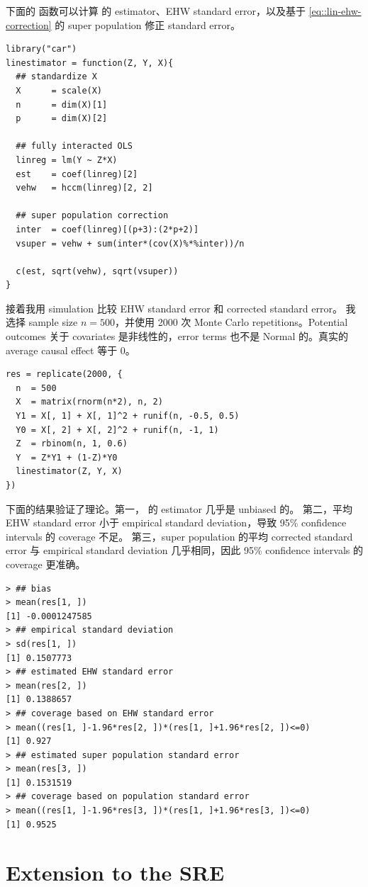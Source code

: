 下面的  函数可以计算 \citet{lin2013} 的 estimator、EHW standard error，以及基于 \eqref{eq::lin-ehw-correction} 的 super population 修正 standard error。 
\begin{lstlisting}
library("car")
linestimator = function(Z, Y, X){
  ## standardize X
  X      = scale(X)
  n      = dim(X)[1]
  p      = dim(X)[2]
  
  ## fully interacted OLS
  linreg = lm(Y ~ Z*X)
  est    = coef(linreg)[2]
  vehw   = hccm(linreg)[2, 2]
  
  ## super population correction
  inter  = coef(linreg)[(p+3):(2*p+2)]
  vsuper = vehw + sum(inter*(cov(X)%*%inter))/n
  
  c(est, sqrt(vehw), sqrt(vsuper))
}
\end{lstlisting}


接着我用 simulation 比较 EHW standard error 和 corrected standard error。
我选择 sample size $n=500$，并使用 2000 次 Monte Carlo repetitions。Potential outcomes 关于 covariates 是非线性的，error terms 也不是 Normal 的。真实的 average causal effect 等于 $0$。
\begin{lstlisting}
res = replicate(2000, {
  n  = 500
  X  = matrix(rnorm(n*2), n, 2)
  Y1 = X[, 1] + X[, 1]^2 + runif(n, -0.5, 0.5)
  Y0 = X[, 2] + X[, 2]^2 + runif(n, -1, 1)
  Z  = rbinom(n, 1, 0.6)
  Y  = Z*Y1 + (1-Z)*Y0
  linestimator(Z, Y, X)
})
\end{lstlisting}


下面的结果验证了理论。第一，\citet{lin2013} 的 estimator 几乎是 unbiased 的。
第二，平均 EHW standard error 小于 empirical standard deviation，导致 95\% confidence intervals 的 coverage 不足。
第三，super population 的平均 corrected standard error 与 empirical standard deviation 几乎相同，因此 95\% confidence intervals 的 coverage 更准确。  
\begin{lstlisting}
> ## bias
> mean(res[1, ])
[1] -0.0001247585
> ## empirical standard deviation
> sd(res[1, ])
[1] 0.1507773
> ## estimated EHW standard error
> mean(res[2, ])
[1] 0.1388657
> ## coverage based on EHW standard error
> mean((res[1, ]-1.96*res[2, ])*(res[1, ]+1.96*res[2, ])<=0)
[1] 0.927
> ## estimated super population standard error
> mean(res[3, ])
[1] 0.1531519
> ## coverage based on population standard error
> mean((res[1, ]-1.96*res[3, ])*(res[1, ]+1.96*res[3, ])<=0)
[1] 0.9525
\end{lstlisting}

\section{Extension to the SRE}

